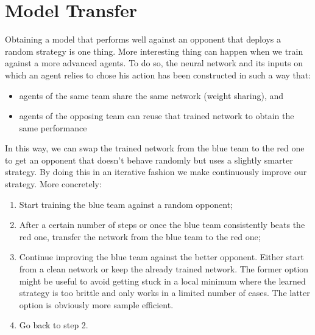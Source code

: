 \section{Model Transfer}
\label{sec:model_transfer}
Obtaining a model that performs well against an opponent that deploys a random strategy is one thing. More interesting thing can happen when we train against a more advanced agents. To do so, the neural network and its inputs on which an agent relies to chose his action has been constructed in such a way that:
\begin{itemize}
    \item agents of the same team share the same network (weight sharing), and
    \item agents of the opposing team can reuse that trained network to obtain the same performance 
\end{itemize}
In this way, we can swap the trained network from the blue team to the red one to get an opponent that doesn't behave randomly but uses a slightly smarter strategy. By doing this in an iterative fashion we make continuously improve our strategy. More concretely:
\begin{enumerate}
    \item Start training the blue team against a random opponent;
    \item After a certain number of steps or once the blue team consistently beats the red one, transfer the network from the blue team to the red one;
    \item Continue improving the blue team against the better opponent. Either start from a clean network or keep the already trained network. The former option might be useful to avoid getting stuck in a local minimum where the learned strategy is too brittle and only works in a limited number of cases. The latter option is obviously more sample efficient.
    \item Go back to step 2.
\end{enumerate}

